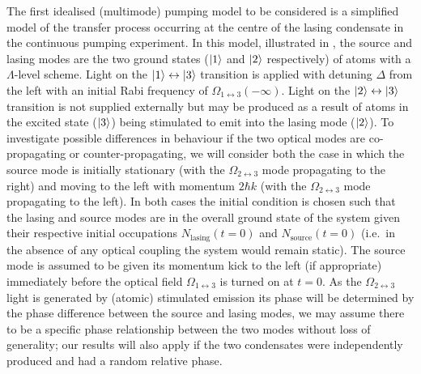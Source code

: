The first idealised (multimode) pumping model to be considered is a simplified model of the transfer process occurring at the centre of the lasing condensate in the continuous pumping experiment.  In this model, illustrated in , the source and lasing modes are the two ground states (${\left|1\right>}$ and ${\left|2\right>}$ respectively) of atoms with a $\Lambda$-level scheme.  Light on the ${\left|1\right>} \leftrightarrow {\ensuremath{\left|3\right>}}$ transition is applied with detuning $\Delta$ from the left with an initial Rabi frequency of $\Omega_{1\leftrightarrow 3}(-\infty)$.  Light on the ${\left|2\right>} \leftrightarrow {\ensuremath{\left|3\right>}}$ transition is not supplied externally but may be produced as a result of atoms in the excited state (${\left|3\right>}$) being stimulated to emit into the lasing mode (${\left|2\right>}$).  To investigate possible differences in behaviour if the two optical modes are co-propagating or counter-propagating, we will consider both the case in which the source mode is initially stationary (with the $\Omega_{2\leftrightarrow 3}$ mode propagating to the right) and moving to the left with momentum $2 \hbar k$ (with the $\Omega_{2\leftrightarrow 3}$ mode propagating to the left).  In both cases the initial condition is chosen such that the lasing and source modes are in the overall ground state of the system given their respective initial occupations $N_\text{lasing}(t=0)$ and $N_\text{source}(t=0)$ (i.e.\  in the absence of any optical coupling the system would remain static).  The source mode is assumed to be given its momentum kick to the left (if appropriate) immediately before the optical field $\Omega_{1\leftrightarrow 3}$ is turned on at $t=0$.  As the $\Omega_{2\leftrightarrow 3}$ light is generated by (atomic) stimulated emission its phase will be determined by the phase difference between the source and lasing modes, we may assume there to be a specific phase relationship between the two modes without loss of generality; our results will also apply if the two condensates were independently produced and had a random relative phase.

